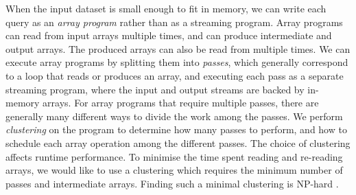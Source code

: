
When the input dataset is small enough to fit in memory, we can write each query as an \emph{array program} rather than as a streaming program.
Array programs can read from input arrays multiple times, and can produce intermediate and output arrays.
The produced arrays can also be read from multiple times.
We can execute array programs by splitting them into \emph{passes}, which generally correspond to a loop that reads or produces an array, and executing each pass as a separate streaming program, where the input and output streams are backed by in-memory arrays.
For array programs that require multiple passes, there are generally many different ways to divide the work among the passes.
We perform \emph{clustering} on the program to determine how many passes to perform, and how to schedule each array operation among the different passes.
The choice of clustering affects runtime performance.
To minimise the time spent reading and re-reading arrays, we would like to use a clustering which requires the minimum number of passes and intermediate arrays.
Finding such a minimal clustering is NP-hard \cite{darte1999complexity}.

